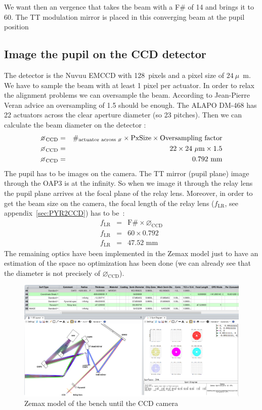\documentclass[12pt,a4paper]{article}
\begin{document}
We want then an vergence that takes the beam with a F# of 14 and brings it to 60. The TT modulation mirror is placed in this converging beam at the pupil position


\subsection{Image the pupil on the CCD detector}\label{subsec:4eme_partie}
The detector is the Nuvuu EMCCD with 128~pixels and a pixel size of $24~\mu$~m. We have to sample the beam with at least 1 pixel per actuator. In order to relax the alignment problems we can oversample the beam. According to Jean-Pierre Veran advice an oversampling of 1.5 should be enough. The ALAPO DM-468 has 22 actuators across the clear aperture diameter (so 23 pitches). Then we can calculate the beam diameter on the detector :
\begin{eqnarray}
	\diameter_{\text{CCD}} &= &\#_{\text{actuator across \diameter}}\times \text{PxSize}\times\text{Oversampling factor}\\
	\diameter_{\text{CCD}} &= &22\times 24~\mu\text{m}\times 1.5\\
	\diameter_{\text{CCD}} &= &0.792\,\,\text{mm}
\end{eqnarray}
The pupil has to be images on the camera. The TT mirror (pupil plane) image through the OAP3 is at the infinity. So when we image it through the relay lens the pupil plane arrives at the focal plane of the relay lens. Moreover, in order to get the beam size on the camera, the focal length of the relay lens ($f_{\text{LR}}$, see appendix~\ref{sec:PYR2CCD}) has to be~:
\begin{eqnarray}
	f_{\text{LR}} &= &\text{F}\# \times \diameter_{\text{CCD}}\\
	f_{\text{LR}} &= &60\times 0.792\\
	f_{\text{LR}} &= &47.52\,\,\text{mm}
\end{eqnarray}
The remaining optics have been implemented in the Zemax model just to have an estimation of the space no optimization has been done (we can already see that the diameter is not precisely of $\diameter_\text{CCD}$).\\
\begin{figure}[H]
	\begin{center}
		\includegraphics[width=\textwidth]{images/Zemax_model_FP_CCD.PNG}
		\caption{Zemax model of the bench until the CCD camera}\label{fig:Zemax_model_FP_CCD}
	\end{center}
\end{figure}
\end{document}
